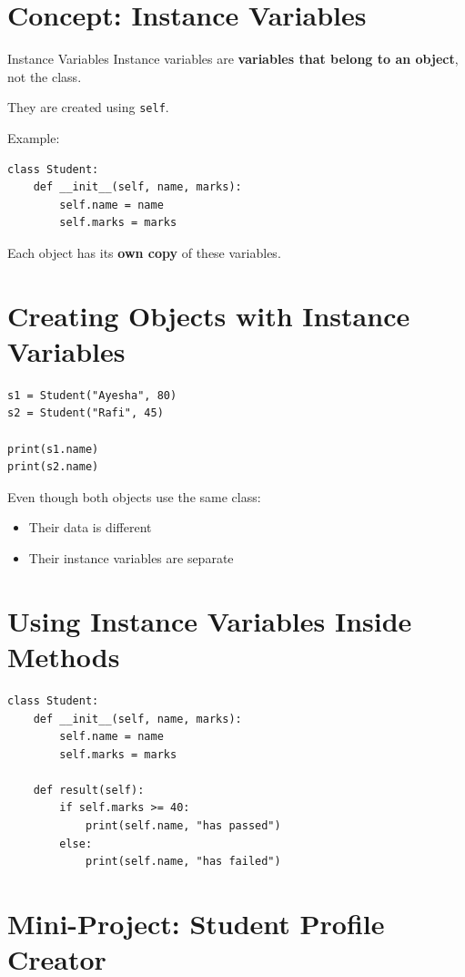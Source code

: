 \section{Concept: Instance Variables}

\begin{definition}{Instance Variables}
Instance variables are \textbf{variables that belong to an object}, not the class.
\end{definition}

They are created using \texttt{self}.

Example:
\begin{verbatim}
class Student:
    def __init__(self, name, marks):
        self.name = name
        self.marks = marks
\end{verbatim}

Each object has its \textbf{own copy} of these variables.

\section{Creating Objects with Instance Variables}

\begin{verbatim}
s1 = Student("Ayesha", 80)
s2 = Student("Rafi", 45)

print(s1.name)
print(s2.name)
\end{verbatim}

Even though both objects use the same class:
\begin{itemize}
    \item Their data is different
    \item Their instance variables are separate
\end{itemize}

\section{Using Instance Variables Inside Methods}

\begin{verbatim}
class Student:
    def __init__(self, name, marks):
        self.name = name
        self.marks = marks

    def result(self):
        if self.marks >= 40:
            print(self.name, "has passed")
        else:
            print(self.name, "has failed")
\end{verbatim}

\section{Mini-Project: Student Profile Creator}

